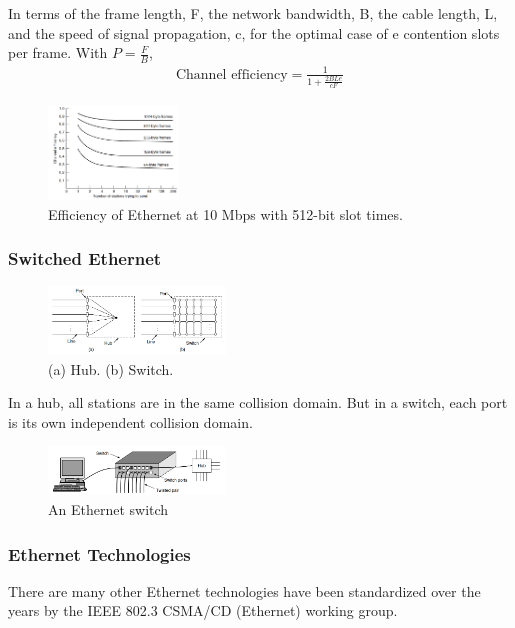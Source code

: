 In terms of the frame length, F, the network bandwidth, B, the cable length, L, and the speed of signal propagation, c, for the optimal case of e contention slots per frame. With $P=\frac{F}{B}$, 
\begin{align*}
    \text{Channel efficiency}=\frac{1}{1+\frac{2BLe}{cF}}
\end{align*}
\begin{figure}[!htb]
    \centering
    \includegraphics[width=0.309\textwidth]{pic/CN4/Efficiency of Ethernet}
    \caption{Efficiency of Ethernet at 10 Mbps with 512-bit slot times.}
\end{figure}%

\subsubsection{Switched Ethernet}
\begin{figure}[!htb]
    \centering
    \includegraphics[width=0.42\textwidth]{pic/CN4/Hub and Switch}
    \caption{ (a) Hub. (b) Switch.}
\end{figure}

In a hub, all stations are in the same collision domain. But in a switch, each port is its own independent collision domain.
\begin{figure}[!htb]
    \centering
    \includegraphics[width=0.42\textwidth]{pic/CN4/An Ethernet switch}
    \caption{An Ethernet switch}
\end{figure}

\subsubsection{Ethernet Technologies}
There are many other Ethernet technologies have been standardized over the years by the IEEE 802.3 CSMA/CD (Ethernet) working group.


